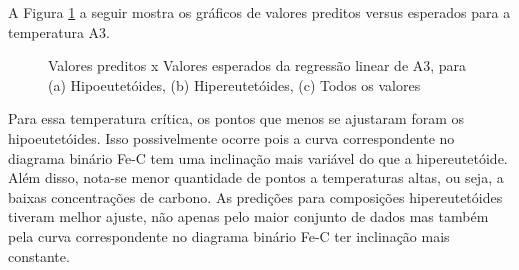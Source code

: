 \documentclass[brazil,tf,epusp]{usp}  %
\begin{document}
A Figura \ref{fig:LR_A3} a seguir mostra os gráficos de valores preditos versus esperados para a temperatura A3.

\begin{figure}[!h]
\caption{Valores preditos x Valores esperados da regressão linear de A3, para (a) Hipoeutetóides, (b) Hipereutetóides, (c) Todos os valores}
\label{fig:LR_A3}
\end{figure}

Para essa temperatura crítica, os pontos que menos se ajustaram foram os hipoeutetóides. Isso possivelmente ocorre pois a curva correspondente no diagrama binário Fe-C tem uma inclinação mais variável do que a hipereutetóide. Além disso, nota-se menor quantidade de pontos a temperaturas altas, ou seja, a baixas concentrações de carbono. As predições para composições hipereutetóides tiveram melhor ajuste, não apenas pelo maior conjunto de dados mas também pela curva correspondente no diagrama binário Fe-C ter inclinação mais constante.
\end{document}

